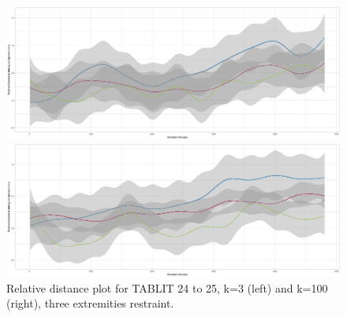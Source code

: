 \documentclass[oneside]{scrreprt}
\begin{document}
\begin{figure}[h]
    
    \label{fig:reldist_tablit}

\begin{minipage}{0.5\textwidth}
\includegraphics[width=1\textwidth]{plots/reldistplot_tablit2425_k3ex3.png}
\end{minipage}
\begin{minipage}{0.5\textwidth}
\includegraphics[width=1\textwidth]{plots/reldistplot_tablit2425_k100ex3.png}
\end{minipage}


\caption[Relative distance plot: TABLIT 24 to 25, k=3 and k=100]{Relative distance plot for TABLIT  24 to 25, k=3 (left) and k=100 (right), three extremities restraint.}
\end{figure}
\end{document}
